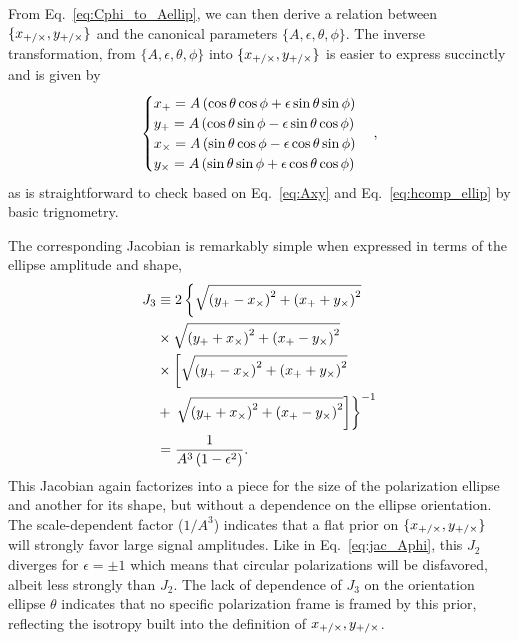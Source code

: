 \documentclass[aps,prd,twocolumn,superscriptaddress,preprintnumbers,floatfix,nofootinbib]{revtex4-2}
\newcommand*{\eq}[1]{Eq.~\eqref{eq:#1}}
\begin{document}
From \eq{Cphi_to_Aellip}, we can then derive a relation between $\{x_{+/\times}, y_{+/\times}\}$ and the canonical parameters $\{A,\epsilon,\theta,\phi\}$.
The inverse transformation, from  $\{A,\epsilon,\theta,\phi\}$ into $\{x_{+/\times}, y_{+/\times}\}$ is easier to express succinctly and is given by
\begin{equation} \label{eq:Axy_to_Cphi}
\begin{cases}
x_{+} = A \left(\cos\theta \cos\phi + \epsilon \sin\theta \sin\phi\right)\\
y_{+} = A \left(\cos\theta \sin\phi - \epsilon \sin\theta \cos\phi\right)\\
x_{\times} = A \left(\sin\theta \cos\phi - \epsilon \cos\theta \sin\phi\right)\\
y_{\times} = A \left(\sin\theta \sin\phi + \epsilon \cos\theta \cos\phi\right)
\end{cases} ,
\end{equation}
as is straightforward to check based on \eq{Axy} and \eq{hcomp_ellip} by basic trignometry.

The corresponding Jacobian is remarkably simple when expressed in terms of the ellipse amplitude and shape,
\begin{subequations} \label{eq:jac_Aeps_Axy}
\begin{align}
J_3 &\equiv 2 \left\{\sqrt{\left(y_{+} -x_{\times} \right)^2 +\left(x_{+} +y_{\times}\right)^2}
\right. \nonumber \\
&\times \sqrt{\left(y_{+} + x_{\times}\right)^2 + \left(x_{+} - y_{\times}\right)^2}  \nonumber\\
&\times \left[ \sqrt{\left(y_{+} -x_{\times} \right)^2 +\left(x_{+} +y_{\times}\right)^2} \right.  \nonumber\\
&+ \left.\left. \sqrt{\left(y_{+} + x_{\times}\right)^2 + \left(x_{+} - y_{\times}\right)^2} \right]\right\}^{-1} \\
&= \frac{1}{A^{3} \left(1 - \epsilon^2\right)}  .
\end{align}
\end{subequations}
This Jacobian again factorizes into a piece for the size of the polarization ellipse and another for its shape, but without a dependence on the ellipse orientation.
The scale-dependent factor ($1/A^3$) indicates that a flat prior on $\{x_{+/\times},y_{+/\times}\}$ will strongly favor large signal amplitudes.
Like in \eq{jac_Aphi}, this $J_2$ diverges for $\epsilon = \pm 1$ which means that circular polarizations will be disfavored, albeit less strongly than $J_2$.
The lack of dependence of $J_3$ on the orientation ellipse $\theta$ indicates that no specific polarization frame is framed by this prior, reflecting the isotropy built into the definition of $x_{+/\times}, y_{+/\times}$.
\end{document}
